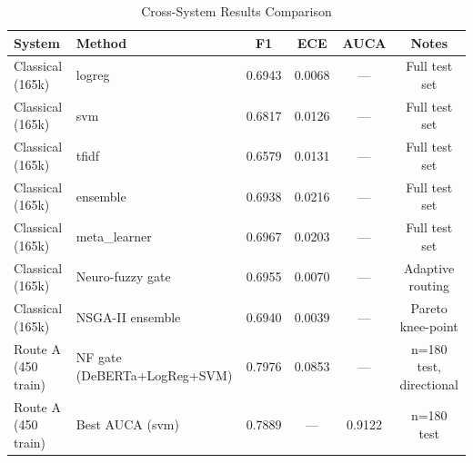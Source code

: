 \begin{table}[h]
\centering
\caption{Cross-System Results Comparison}
\label{tab:master_results}
\begin{tabular}{llcccc}
\hline
System & Method & F1 & ECE & AUCA & Notes \\
\hline
Classical (165k) & logreg & 0.6943 & 0.0068 & — & Full test set \\
Classical (165k) & svm & 0.6817 & 0.0126 & — & Full test set \\
Classical (165k) & tfidf & 0.6579 & 0.0131 & — & Full test set \\
Classical (165k) & ensemble & 0.6938 & 0.0216 & — & Full test set \\
Classical (165k) & meta_learner & 0.6967 & 0.0203 & — & Full test set \\
Classical (165k) & Neuro-fuzzy gate & 0.6955 & 0.0070 & — & Adaptive routing \\
Classical (165k) & NSGA-II ensemble & 0.6940 & 0.0039 & — & Pareto knee-point \\
Route A (450 train) & NF gate (DeBERTa+LogReg+SVM) & 0.7976 & 0.0853 & — & n=180 test, directional \\
Route A (450 train) & Best AUCA (svm) & 0.7889 & — & 0.9122 & n=180 test \\
\hline
\end{tabular}
\end{table}